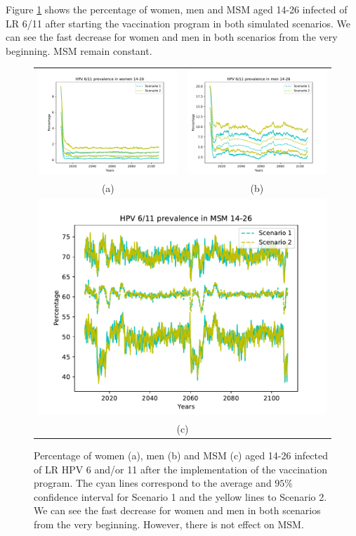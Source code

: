 Figure \ref{fig:prev_AUS_6_11} shows the percentage of women, men and MSM aged 14-26 infected of LR 6/11 after starting the vaccination program in both simulated scenarios. We can see the fast decrease for women and men in both scenarios from the very beginning. MSM remain constant. 

\begin{figure}[!]
	\centering
	\begin{tabular}{cc}
		\includegraphics[width=0.5\linewidth]{IMGs/3.-Australia/retrieve_14_26_verr_muj.pdf}	& 
		\includegraphics[width=0.5\linewidth]{IMGs/3.-Australia/retrieve_14_26_verr_hom.pdf}  \\ 
		(a)	& (b) \\ 
		\multicolumn{2}{c}{ \includegraphics[width=0.5\linewidth]{IMGs/3.-Australia/retrieve_14_26_verr_MSM.pdf} } \\ 
		\multicolumn{2}{c}{(c)} \\ 
	\end{tabular} 
	\caption{Percentage of women (a), men (b) and MSM (c) aged 14-26 infected of LR HPV 6 and/or 11 after the implementation of the vaccination program. The cyan lines correspond to the average and $95\%$ confidence interval for Scenario 1 and the yellow lines to Scenario 2.  We can see the fast decrease for women and men in both scenarios from the very beginning. However, there is not effect on MSM.}
	\label{fig:prev_AUS_6_11}	
\end{figure}

